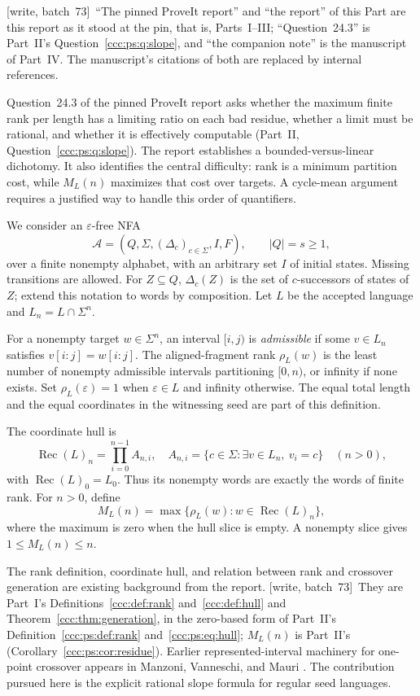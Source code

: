 \documentclass[11pt,letterpaper]{article}
\theoremstyle{definition}
\theoremstyle{remark}
\newcommand{\eps}{\varepsilon}
\newcommand{\rec}{\operatorname{Rec}}
\newcommand{\rank}{\rho}
\newcommand{\wsevthree}{\textup{[write, batch~73]}}
\begin{document}
\wsevthree\ ``The pinned ProveIt report'' and ``the report'' of this Part are
this report as it stood at the pin, that is, Parts~I--III; ``Question~24.3''
is Part~II's Question~\ref{ccc:ps:q:slope}, and ``the companion note'' is the
manuscript of Part~IV. The manuscript's citations of both are replaced by
internal references.

Question~24.3 of the pinned ProveIt report asks whether the maximum finite rank per length has a limiting ratio on each bad residue, whether a limit must be rational, and whether it is effectively computable (Part~II, Question~\ref{ccc:ps:q:slope}). The report establishes a bounded-versus-linear dichotomy. It also identifies the central difficulty: rank is a minimum partition cost, while $M_L(n)$ maximizes that cost over targets. A cycle-mean argument requires a justified way to handle this order of quantifiers.

We consider an $\eps$-free NFA
\[
\mathcal A=(Q,\Sigma,(\Delta_c)_{c\in\Sigma},I,F),\qquad |Q|=s\ge1,
\]
over a finite nonempty alphabet, with an arbitrary set $I$ of initial states. Missing transitions are allowed. For $Z\subseteq Q$, $\Delta_c(Z)$ is the set of $c$-successors of states of $Z$; extend this notation to words by composition. Let $L$ be the accepted language and $L_n=L\cap\Sigma^n$.

For a nonempty target $w\in\Sigma^n$, an interval $[i,j)$ is \emph{admissible} if some $v\in L_n$ satisfies $v[i:j]=w[i:j]$. The aligned-fragment rank $\rank_L(w)$ is the least number of nonempty admissible intervals partitioning $[0,n)$, or infinity if none exists. Set $\rank_L(\eps)=1$ when $\eps\in L$ and infinity otherwise. The equal total length and the equal coordinates in the witnessing seed are part of this definition.

The coordinate hull is
\[
\rec(L)_n=\prod_{i=0}^{n-1}A_{n,i},\quad
A_{n,i}=\{c\in\Sigma:\exists v\in L_n,\ v_i=c\}\quad(n>0),
\]
with $\rec(L)_0=L_0$. Thus its nonempty words are exactly the words of finite rank. For $n>0$, define
\[
M_L(n)=\max\{\rank_L(w):w\in\rec(L)_n\},
\]
where the maximum is zero when the hull slice is empty. A nonempty slice gives $1\le M_L(n)\le n$.

The rank definition, coordinate hull, and relation between rank and crossover generation are existing background from the report.
\wsevthree\ They are Part~I's Definitions~\ref{ccc:def:rank} and~\ref{ccc:def:hull}
and Theorem~\ref{ccc:thm:generation}, in the zero-based form of Part~II's
Definition~\ref{ccc:ps:def:rank} and~\eqref{ccc:ps:eq:hull}; $M_L(n)$ is
Part~II's (Corollary~\ref{ccc:ps:cor:residue}). Earlier represented-interval machinery for one-point crossover appears in Manzoni, Vanneschi, and Mauri \cite{Manzoni}. The contribution pursued here is the explicit rational slope formula for regular seed languages.
\end{document}

